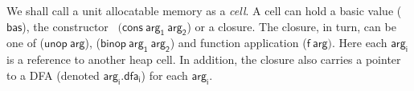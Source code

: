 \documentclass[preprint,9pt]{sigplanconf}
\begin{document}

We shall call a  unit allocatable memory as a {\em  cell}.  A cell can
hold    a    basic    value    ($\mathsf{bas}$),    the    constructor
\CONS\ $(\mathsf{cons~  arg_1~arg_2}$) or a closure.   The closure, in
turn,    can    be    one   of    ($\mathsf{unop~arg}$),    ($\mathsf{
  binop~arg_1~arg_2}$)  and  function application  ($\mathsf{f~arg})$.
Here each $\mathsf{  arg_i}$ is a reference to another  heap cell.  In
addition, the closure also carries  a pointer to a DFA (denoted
$\mathsf{arg_i.dfa_i}$) for each $\mathsf{arg_i}$.
\end{document}
